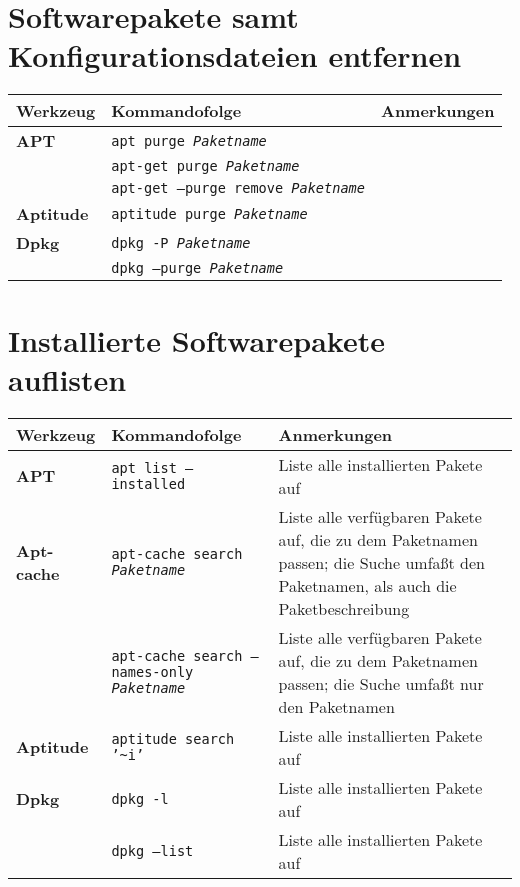\documentclass[10pt]{article}
\begin{document}
\section{Softwarepakete samt Konfigurationsdateien entfernen}
\begin{tabular}{ p{3.5cm} p{9cm} p{11cm}}
  \hline
  \rowcolor{Gray}
  \textbf{Werkzeug} & \textbf{Kommandofolge} & \textbf{Anmerkungen} \\
  \hline 
  \textbf{APT}& \texttt{apt purge \textit{Paketname}} & \\
  \rowcolor{Gray}
  & \texttt{apt-get purge \textit{Paketname}} & \\
  & \texttt{apt-get --purge remove \textit{Paketname}} & \\
  \rowcolor{Gray}
  \textbf{Aptitude} & \texttt{aptitude purge \textit{Paketname}} & \\
  \textbf{Dpkg} & \texttt{dpkg -P \textit{Paketname}} & \\
  \rowcolor{Gray}
  & \texttt{dpkg --purge \textit{Paketname}} & \\
  \hline
\end{tabular}

\newpage

\cheatsheet

\section{Installierte Softwarepakete auflisten}
\begin{tabular}{ p{3.5cm} p{9cm} p{11cm}}
  \hline
  \rowcolor{Gray}
  \textbf{Werkzeug} & \textbf{Kommandofolge} & \textbf{Anmerkungen} \\
  \hline 
  \textbf{APT}& \texttt{apt list --installed} & Liste alle installierten Pakete auf\\
  \rowcolor{Gray}
  \textbf{Apt-cache} & \texttt{apt-cache search \textit{Paketname}} & Liste alle verfügbaren Pakete auf, die zu dem Paketnamen passen; die Suche umfaßt den Paketnamen, als auch die Paketbeschreibung \\
  & \texttt{apt-cache search --names-only \textit{Paketname}} & Liste alle verfügbaren Pakete auf, die zu dem Paketnamen passen; die Suche umfaßt nur den Paketnamen \\
  \rowcolor{Gray}
  \textbf{Aptitude} & \texttt{aptitude search '\textasciitilde{}i'} & Liste alle installierten Pakete auf \\
  \textbf{Dpkg} & \texttt{dpkg -l} & Liste alle installierten Pakete auf \\
  \rowcolor{Gray}
  & \texttt{dpkg --list} & Liste alle installierten Pakete auf \\
  \hline
\end{tabular}
\end{document}
